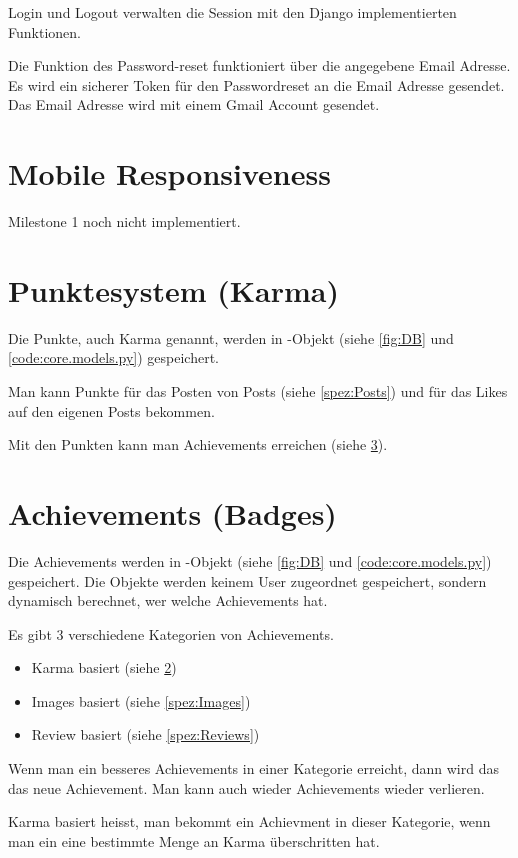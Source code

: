 Login und Logout verwalten die Session mit den Django implementierten
Funktionen.

Die Funktion des Password-reset funktioniert über die angegebene Email Adresse.
Es wird ein sicherer Token für den Passwordreset an die Email Adresse gesendet.
Das Email Adresse wird mit einem Gmail Account gesendet.

\section{Mobile Responsiveness} \label{spez:Mobile}

Milestone 1 noch nicht implementiert.

\section{Punktesystem (Karma)} \label{spez:Karma}

Die Punkte, auch Karma genannt, werden in -Objekt (siehe
\ref{fig:DB} und \ref{code:core.models.py}) gespeichert.

Man kann Punkte für das Posten von Posts (siehe \ref{spez:Posts}) und für das
Likes auf den eigenen Posts bekommen.

Mit den Punkten kann man Achievements erreichen (siehe \ref{spez:Badges}).

\section{Achievements (Badges)} \label{spez:Badges}

Die Achievements werden in -Objekt (siehe \ref{fig:DB} und
\ref{code:core.models.py}) gespeichert. Die Objekte werden keinem User
zugeordnet gespeichert, sondern dynamisch berechnet, wer welche Achievements
hat.

Es gibt 3 verschiedene Kategorien von Achievements.
\begin{itemize}
    \item Karma basiert (siehe \ref{spez:Karma})
    \item Images basiert (siehe \ref{spez:Images})
    \item Review basiert (siehe \ref{spez:Reviews})
\end{itemize}

Wenn man ein besseres Achievements in einer Kategorie erreicht, dann wird das
das neue Achievement. Man kann auch wieder Achievements wieder verlieren.

Karma basiert heisst, man bekommt ein Achievment in dieser Kategorie, wenn man
ein eine bestimmte Menge an Karma überschritten hat.

